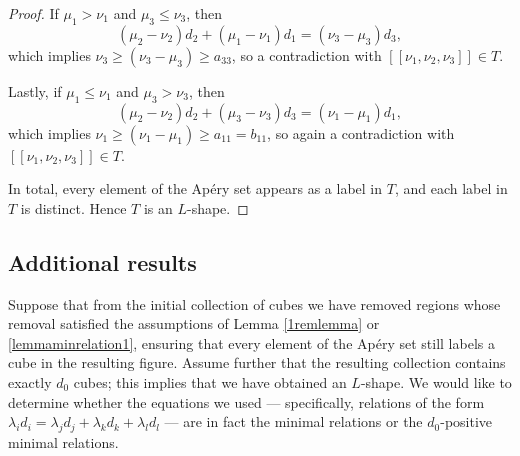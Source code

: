 \documentclass[12pt]{article}
\theoremstyle{remark}
\begin{document}
\begin{proof}
    If $\mu_1 > \nu_1$ and $\mu_3 \leq \nu_3$, then
    \begin{equation}\label{propnottrick-eq3}
         (\mu_2-\nu_2)d_2 + (\mu_1-\nu_1)d_1  =  (\nu_3-\mu_3)d_3,
    \end{equation}
    which implies $\nu_3 \geq (\nu_3-\mu_3) \geq a_{33}$, so a contradiction with $[[\nu_1,\nu_2,\nu_3]] \in T$.

    Lastly, if $\mu_1 \leq \nu_1$ and $\mu_3 > \nu_3$, then
    \begin{equation}\label{propnottrick-eq4}
         (\mu_2-\nu_2)d_2 + (\mu_3-\nu_3)d_3  =  (\nu_1-\mu_1)d_1,
    \end{equation}
    which implies $\nu_1 \geq (\nu_1-\mu_1) \geq a_{11} = b_{11}$, so again a contradiction with $[[\nu_1,\nu_2,\nu_3]] \in T$.

    In total, every element of the Ap{\'e}ry set appears as a label in $T$, and each label in $T$ is distinct. Hence $T$ is an $L$-shape.
\end{proof}



\subsection{Additional results}



Suppose that from the initial collection of cubes we have removed regions whose removal satisfied the assumptions of Lemma \ref{1remlemma} or \ref{lemmaminrelation1}, ensuring that every element of the Ap{\'e}ry set still labels a cube in the resulting figure. Assume further that the resulting collection contains exactly $d_0$ cubes; this implies that we have obtained an $L$-shape. We would like to determine whether the equations we used --- specifically, relations of the form $\lambda_id_i = \lambda_jd_j + \lambda_kd_k + \lambda_ld_l$ --- are in fact the minimal relations or the $d_0$-positive minimal relations.
\end{document}
